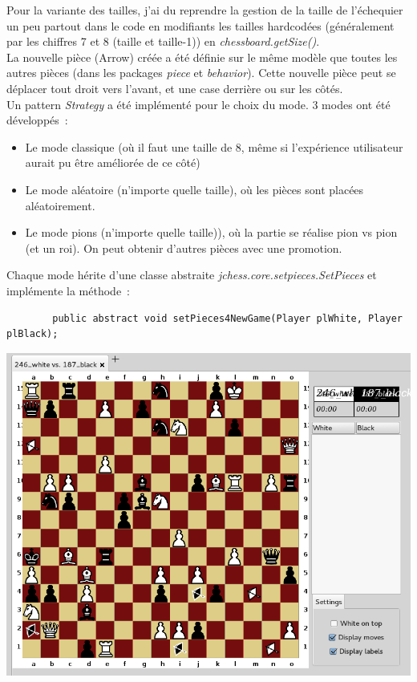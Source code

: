 \documentclass{article}
\begin{document}
	Pour la variante des tailles, j'ai du reprendre la gestion de la taille de l'échequier un peu partout dans le code en modifiants les tailles hardcodées (généralement par les chiffres 7 et 8 (taille et taille-1)) en \emph{chessboard.getSize()}.\\
	La nouvelle pièce (Arrow) créée a été définie sur le même modèle que toutes les autres pièces (dans les packages \emph{piece} et \emph{behavior}). Cette nouvelle pièce peut se déplacer tout droit vers l'avant, et une case derrière ou sur les côtés.\\
	Un pattern \emph{Strategy} a été implémenté pour le choix du mode. 3 modes ont été développés~:
	\begin{itemize}
		\item Le mode classique (où il faut une taille de 8, même si l'expérience utilisateur aurait pu être améliorée de ce côté)
		\item Le mode aléatoire (n'importe quelle taille), où les pièces sont placées aléatoirement.
		\item Le mode pions (n'importe quelle taille)), où la partie se réalise pion vs pion (et un roi). On peut obtenir d'autres pièces avec une promotion.
	\end{itemize}
	Chaque mode hérite d'une classe abstraite \emph{jchess.core.setpieces.SetPieces} et implémente la méthode~:
	\begin{verbatim}
		public abstract void setPieces4NewGame(Player plWhite, Player plBlack);
	\end{verbatim}
	\begin{center}
		\includegraphics[scale=0.5]{img/Variantes}
		\label{Variantes}
	\end{center}
\end{document}
